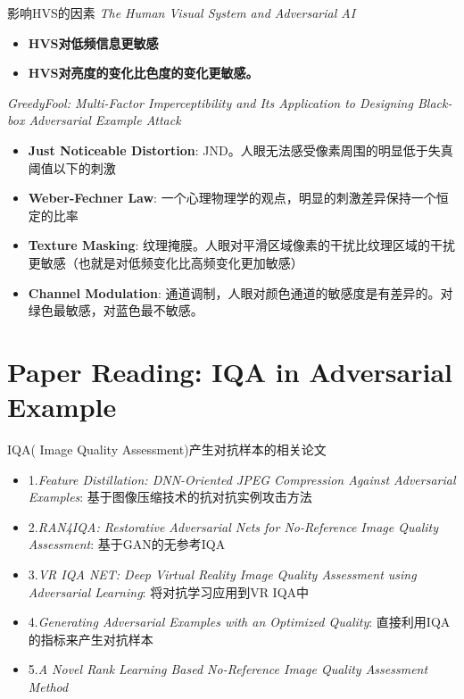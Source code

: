 \begin{frame}{影响HVS的因素}
    \emph{The Human Visual System and Adversarial AI}
    \begin{itemize}
        \item \textbf{HVS对低频信息更敏感}
        \item \textbf{HVS对亮度的变化比色度的变化更敏感。}
    \end{itemize}

    \emph{GreedyFool: Multi-Factor Imperceptibility and Its Application to Designing Black-box Adversarial Example Attack}
    \begin{itemize}
        \item \textbf{Just Noticeable Distortion}: JND。人眼无法感受像素周围的明显低于失真阈值以下的刺激 
        \item \textbf{Weber-Fechner Law}: 一个心理物理学的观点，明显的刺激差异保持一个恒定的比率
        \item \textbf{Texture Masking}: 纹理掩膜。人眼对平滑区域像素的干扰比纹理区域的干扰更敏感（也就是对低频变化比高频变化更加敏感）
        \item \textbf{Channel Modulation}: 通道调制，人眼对颜色通道的敏感度是有差异的。对绿色最敏感，对蓝色最不敏感。
    \end{itemize}
\end{frame}











\section{Paper Reading: IQA in Adversarial Example}

\begin{frame}{IQA( Image Quality Assessment)产生对抗样本的相关论文}
    \begin{itemize}
        \item 1.\emph{Feature Distillation: DNN-Oriented JPEG Compression Against Adversarial Examples}: 基于图像压缩技术的抗对抗实例攻击方法
        \item 2.\emph{RAN4IQA: Restorative Adversarial Nets for No-Reference Image Quality Assessment}: 基于GAN的无参考IQA
        \item 3.\emph{VR IQA NET: Deep Virtual Reality Image Quality Assessment using Adversarial Learning}: 将对抗学习应用到VR IQA中
        \item 4.\emph{Generating Adversarial Examples with an Optimized Quality}: 直接利用IQA的指标来产生对抗样本
        \item 5.\emph{A Novel Rank Learning Based No-Reference Image Quality Assessment Method}
    \end{itemize}
\end{frame}